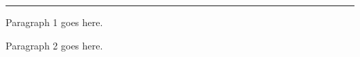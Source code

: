 \documentclass{book}
\newcounter{toto}
\begin{document}
%
%
%
%

\hrule

\beginnumbering
\numberpstarttrue

\pstart
Paragraph 1 goes here.
\pend

\pstart
Paragraph 2 goes here.
\pend

\endnumbering

\thetoto
\end{document}
